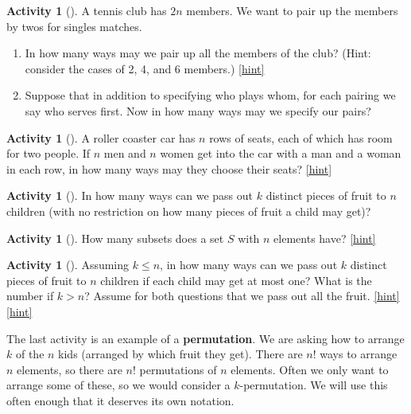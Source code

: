 \documentclass[10pt,]{book}
\newcommand{\terminology}[1]{\textbf{#1}}
\theoremstyle{plain}
\theoremstyle{definition}
\theoremstyle{definition}
\theoremstyle{definition}
\newtheorem{activity}[project]{Activity}
\numberwithin{equation}{chapter}
\begin{document}
\begin{activity}[]\label{tennispairings1}
\hypertarget{p-634}{}%
A tennis club has \(2n\) members. We want to pair up the members by twos for singles matches.%
\begin{enumerate}[font=\bfseries,label=(\alph*),ref=\alph*]
\item\label{task-131} \hypertarget{p-635}{}%
In how many ways may we pair up all the members of the club? (Hint: consider the cases of 2, 4, and 6 members.)%
\hfill{\tiny\hyperlink{a-86.a}{[hint]}\hypertarget{q-86.a}{}}\item\label{task-132} \hypertarget{p-638}{}%
Suppose that in addition to specifying who plays whom, for each pairing we say who serves first.  Now in how many ways may we specify our pairs?%
\end{enumerate}
\end{activity}
\begin{activity}[]\label{activity-80}
\hypertarget{p-639}{}%
A roller coaster car has \(n\) rows of seats, each of which has room for two people. If \(n\) men and \(n\) women get into the car with a man and a woman in each row, in how many ways may they choose their seats?%
\hfill{\tiny\hyperlink{a-87}{[hint]}\hypertarget{q-87}{}}\end{activity}
\begin{activity}[]\label{activity-81}
\hypertarget{p-642}{}%
In how many ways can we pass out \(k\) distinct pieces of fruit to \(n\) children (with no restriction on how many pieces of fruit a child may get)?%
\end{activity}
\begin{activity}[]\label{SubsetsFirstTime}
\hypertarget{p-644}{}%
How many subsets does a set \(S\) with \(n\) elements have?%
\hfill{\tiny\hyperlink{a-89}{[hint]}\hypertarget{q-89}{}}\end{activity}
\begin{activity}[]\label{activity-83}
\hypertarget{p-647}{}%
Assuming \(k\le n\), in how many ways can we pass out \(k\) distinct pieces of fruit to \(n\) children if each child may get at most one? What is the number if \(k>n\)? Assume for both questions that we pass out all the fruit.%
\hfill{\tiny\hyperlink{a-90}{[hint]}\hypertarget{q-90}{}}\hfill{\tiny\hyperlink{a-90}{[hint]}\hypertarget{q-90}{}}\end{activity}
\hypertarget{p-651}{}%
The last activity is an example of a \terminology{permutation}.  We are asking how to arrange \(k\) of the \(n\) kids (arranged by which fruit they get).  There are \(n!\) ways to arrange \(n\) elements, so there are \(n!\) permutations of \(n\) elements.  Often we only want to arrange some of these, so we would consider a \(k\)-permutation.   We will use this often enough that it deserves its own notation.%
\end{document}
